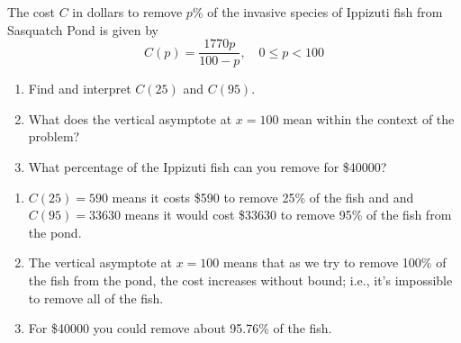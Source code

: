 {The cost $C$ in dollars to remove $p$\% of the invasive species of Ippizuti fish from Sasquatch Pond is given by \[C(p) = \frac{1770p}{100 - p}, \quad 0 \leq p < 100 \]

\begin{enumerate}

\item Find and interpret $C(25)$ and $C(95)$.
\item What does the vertical asymptote at $x = 100$ mean within the context of the problem?  
\item What percentage of the Ippizuti fish can you remove for  \$40000?

\end{enumerate}}
{\begin{enumerate}

\item $C(25) = 590$ means it costs \$590 to remove 25\% of the fish and and $C(95)= 33630$ means it would cost \$33630 to remove 95\% of the fish from the pond.
\item The vertical asymptote at $x = 100$ means that as we try to remove 100\% of the fish from the pond, the cost increases without bound; i.e., it's impossible to remove all of the fish.  
\item For \$40000 you could remove about 95.76\% of the fish.

\end{enumerate}}